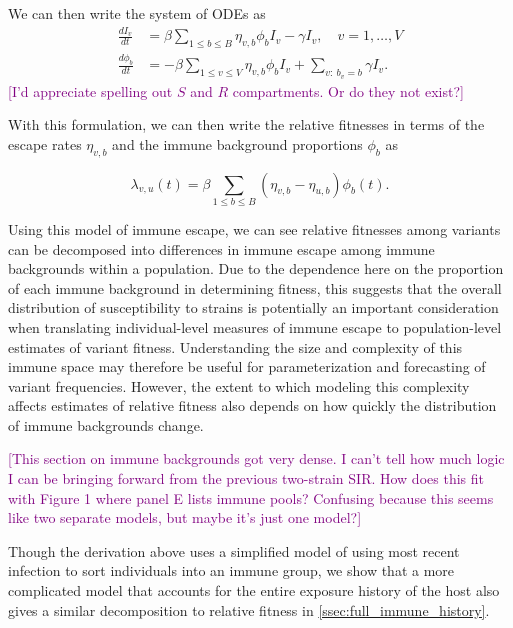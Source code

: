 \documentclass[12pt,oneside,letterpaper]{article}
\def\tbc#1{\textcolor{purple}{[#1]}}
\begin{document}
We can then write the system of ODEs as
\begin{align*}
    \frac{d I_{v}}{dt} &= \beta \sum_{1\leq b \leq B} \eta_{v, b} \phi_{b} I_{v} - \gamma I_{v}, \quad v = 1, \ldots, V\\
    \frac{d \phi_{b}}{dt} &= - \beta \sum_{1\leq v \leq V} \eta_{v,b}\phi_{b} I_{v} +  \sum_{v:\ b_{v} = b} \gamma I_{v}.
\end{align*}
\tbc{I'd appreciate spelling out $S$ and $R$ compartments. Or do they not exist?}

With this formulation, we can then write the relative fitnesses in terms of the escape rates $\eta_{v,b}$ and the immune background proportions $\phi_{b}$ as

\begin{equation} \label{eq:escape_relative_fitness}
    \lambda_{v, u}(t) = \beta \sum_{1\leq b \leq B}(\eta_{v,b} - \eta_{u,b}) \phi_{b}(t).
\end{equation}

Using this model of immune escape, we can see relative fitnesses among variants can be decomposed into differences in immune escape among immune backgrounds within a population.
Due to the dependence here on the proportion of each immune background in determining fitness, this suggests that the overall distribution of susceptibility to strains is potentially an important consideration when translating individual-level measures of immune escape to population-level estimates of variant fitness.
Understanding the size and complexity of this immune space may therefore be useful for parameterization and forecasting of variant frequencies.
However, the extent to which modeling this complexity affects estimates of relative fitness also depends on how quickly the distribution of immune backgrounds change.

\tbc{This section on immune backgrounds got very dense. I can't tell how much logic I can be bringing forward from the previous two-strain SIR. How does this fit with Figure 1 where panel E lists immune pools? Confusing because this seems like two separate models, but maybe it's just one model?}

Though the derivation above uses a simplified model of using most recent infection to sort individuals into an immune group, we show that a more complicated model that accounts for the entire exposure history of the host also gives a similar decomposition to relative fitness in \ref{ssec:full_immune_history}.


\end{document}
